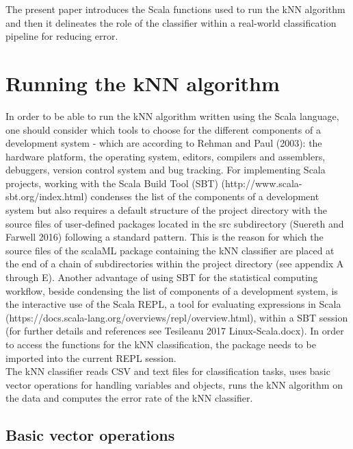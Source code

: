 \documentclass[journal]{IEEEtran}
\begin{document}
      
The present paper introduces the Scala functions used to run the kNN algorithm and then it delineates the role of the classifier within a real-world classification pipeline for reducing error.    
   
\section{Running the kNN algorithm}

In order to be able to run the kNN algorithm written using the Scala language, one should consider which tools to choose for the different components of a development system -  which are according to Rehman and Paul (2003): the hardware platform, the operating system, editors, compilers and assemblers, debuggers, version control system and bug tracking.
For implementing Scala projects, working with the Scala Build Tool (SBT) (http://www.scala-sbt.org/index.html) condenses the list of the components of a development system but also requires a default structure of the project directory with the source files of user-defined packages located in the src subdirectory (Suereth and Farwell 2016) following a standard pattern. This is the reason for which the source files of the scalaML package containing the kNN classifier are placed at the end of a chain of subdirectories within the project directory (see appendix A through E). 
Another advantage of using SBT for the statistical computing workflow, beside condensing the list of components of a development system, is the interactive use of the Scala REPL, a tool for evaluating expressions in Scala (https://docs.scala-lang.org/overviews/repl/overview.html), within a SBT session (for further details and references see Tesileanu 2017 Linux-Scala.docx).  
In order to access the functions for the kNN classification, the package needs to be imported into the current REPL session.\\


The kNN classifier reads CSV and text files for classification tasks, uses basic vector operations for handling variables and objects, runs the kNN algorithm on the data and computes the error rate of the kNN classifier.

\subsection{Basic vector operations}
\end{document}
